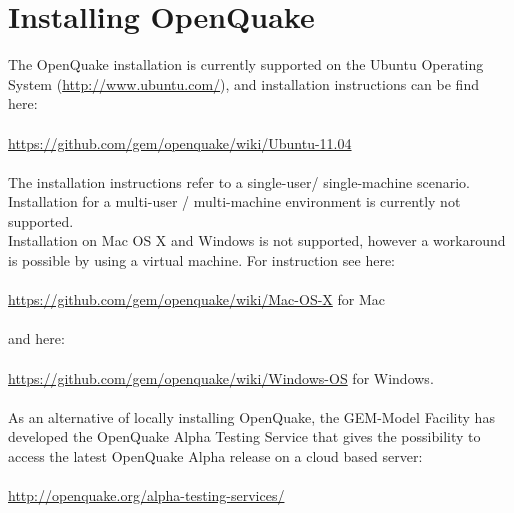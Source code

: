 \section{Installing OpenQuake}
The OpenQuake installation is currently supported on the Ubuntu Operating System (\href{http://www.ubuntu.com/}
   {http://www.ubuntu.com/}), and installation instructions can be find here:\\ \\
    \href{https://github.com/gem/openquake/wiki/Ubuntu-11.04}
   {https://github.com/gem/openquake/wiki/Ubuntu-11.04}\\ \\
The installation instructions refer to a single-user/ single-machine scenario. Installation for a multi-user / multi-machine 
environment is currently not supported.\\
Installation on Mac OS X and Windows is not supported, however a workaround is possible by using a virtual machine. For instruction see here:\\ \\
\href{https://github.com/gem/openquake/wiki/Mac-OS-X}
   {https://github.com/gem/openquake/wiki/Mac-OS-X}   for Mac\\ \\
   and here:\\ \\
   \href{https://github.com/gem/openquake/wiki/Windows-OS}
   {https://github.com/gem/openquake/wiki/Windows-OS} for Windows.\\ \\
As an alternative of locally installing OpenQuake, the GEM-Model Facility has developed the OpenQuake Alpha Testing Service that gives the possibility to access the latest OpenQuake Alpha release on a cloud based server:\\ \\
\href{http://openquake.org/alpha-testing-services/}
   {http://openquake.org/alpha-testing-services/}
   
